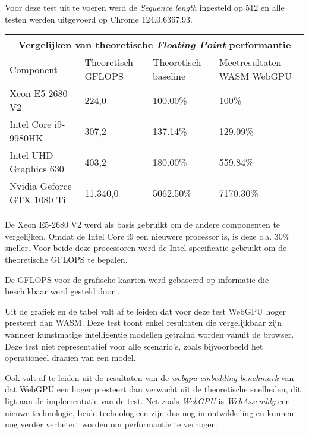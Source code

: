 \bigbreak{}

Voor deze test uit te voeren werd de \textit{Sequence length} ingesteld op 512 en alle testen werden uitgevoerd op Chrome 124.0.6367.93.

\break{}

\begin{tabular}{ |p{5cm}|p{3cm}|p{3cm}|p{3cm}|  }
    \hline
    \multicolumn{4}{|c|}{Vergelijken van theoretische \textit{Floating Point} performantie} \\
    \hline
    Component& Theoretisch GFLOPS & Theoretisch baseline & Meetresultaten WASM WebGPU\\
    \hline
        Xeon E5-2680 V2             & 224,0       & 100.00\%  & 100\%       \\
        Intel Core i9-9980HK        & 307,2     & 137.14\%  & 129.09\%    \\
        Intel UHD Graphics 630      & 403,2     & 180.00\%  & 559.84\%    \\
        Nvidia Geforce GTX 1080 Ti  & 11.340,0    & 5062.50\% & 7170.30\%   \\
    \hline
\end{tabular}

\bigbreak{}

De Xeon E5-2680 V2 werd als basis gebruikt om de andere componenten te vergelijken. Omdat de Intel Core i9 een nieuwere processor is, is deze c.a. 30\% sneller. Voor beide deze processoren werd de Intel specificatie gebruikt om de theoretische GFLOPS te bepalen. \autocite{Intel2024, Intel2024a}

\bigbreak{}

De GFLOPS voor de grafische kaarten werd gebaseerd op informatie die beschikbaar werd gesteld door \textcite{TechPowerUp2017, TechPowerUp2017a}.

\bigbreak{}

Uit de grafiek en de tabel valt af te leiden dat voor deze test WebGPU hoger presteert dan WASM. Deze test toont enkel resultaten die vergelijkbaar zijn wanneer kunstmatige intelligentie modellen getraind worden vanuit de browser. Deze test niet representatief voor alle scenario's, zoals bijvoorbeeld het operationeel draaien van een model.

\bigbreak{}

Ook valt af te leiden uit de resultaten van de \textit{webgpu-embedding-benchmark} van \textcite{Lochner2024} dat WebGPU een hoger presteert dan verwacht uit de theoretische snelheden, dit ligt aan de implementatie van de test. Net zoals \textit{WebGPU} is \textit{WebAssembly} een nieuwe technologie, beide technologieën zijn dus nog in ontwikkeling en kunnen nog verder verbetert worden om performantie te verhogen.

